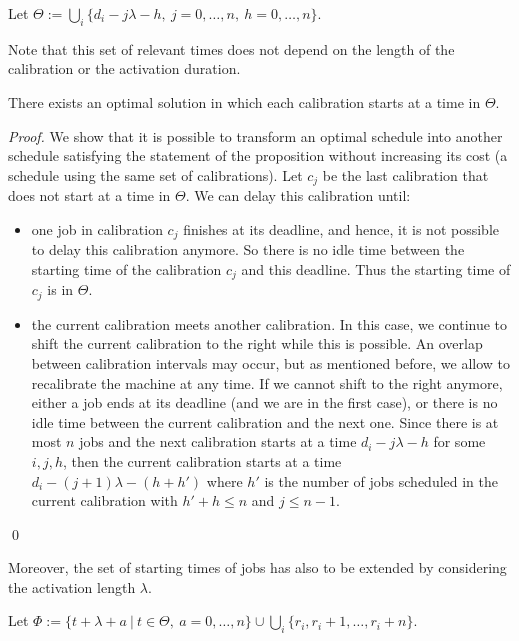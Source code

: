 \begin{definition}
Let $\Theta := \bigcup_i \{ d_i-j\lambda-h,~j=0,\ldots, n, ~h=0,\ldots,n \}$.
\end{definition}

Note that this set of relevant times does not depend on the length of the calibration or the activation duration.



\begin{prop}\label{prop:act_position_calibration}
There exists an optimal solution in which each calibration starts at a time in $\Theta$.
\end{prop}
\begin{proof}
We show that it is possible to transform an optimal schedule into another schedule satisfying the statement of the proposition without increasing its cost (a schedule using the same set of calibrations). Let $c_j$ be the last calibration that does not start at a time in $\Theta$. We can delay this calibration until:
\begin{itemize}
\item one job in calibration $c_j$ finishes at its deadline, and hence, it is not possible to delay this calibration anymore. So there is no idle time between the starting time of the calibration $c_j$ and this deadline. Thus the starting time of $c_j$ is in $\Theta$.
\item the current calibration meets another calibration. In this case, we continue to shift the current calibration to the right while this is possible. An overlap between calibration intervals may occur, but as mentioned before, we allow to recalibrate the machine at any time. If we cannot shift to the right anymore, either a job ends at its deadline (and we are in the first case), or there is no idle time between the current calibration and the next one. Since there is at most $n$ jobs and the next calibration starts at a time $d_i-j\lambda-h$ for some $i,j,h$, then the current calibration starts at a time $d_i-(j+1)\lambda-(h+h')$ where $h'$ is the number of jobs scheduled in the current calibration with $h'  +h\leq n$ and $j\leq n-1$.
\end{itemize}
\qed\end{proof}


Moreover, the set of starting times of jobs has also to be extended by considering the activation length $\lambda$.




\begin{definition}
Let $\Phi := \{ t+\lambda + a~|~t\in \Theta,~a=0,\ldots,n \}
\cup \bigcup_i  \{ r_i, r_i+1, \ldots, r_i+n  \}$.
\end{definition}

